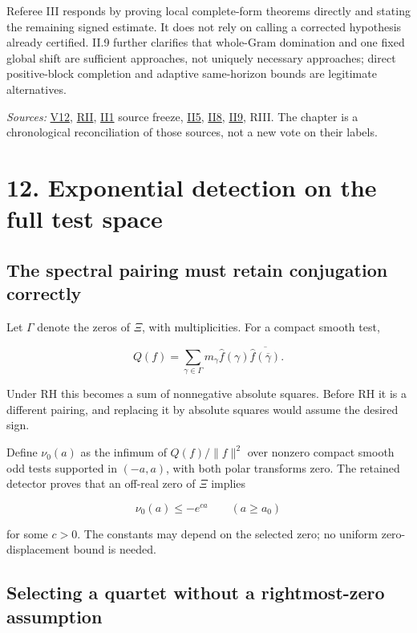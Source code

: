 \documentclass[
  10pt,
  a4paper,
  10pt,
  oneside,
  openany]{book}
\begin{document}
Referee III responds by proving local complete-form theorems directly
and stating the remaining signed estimate. It does not rely on calling a
corrected hypothesis already certified. II.9 further clarifies that
whole-Gram domination and one fixed global shift are sufficient
approaches, not uniquely necessary approaches; direct positive-block
completion and adaptive same-horizon bounds are legitimate alternatives.

\emph{Sources:} \hyperref[source-v12]{V12}, \hyperref[source-rii]{RII},
\hyperref[source-ii1]{II1} source freeze, \hyperref[source-ii5]{II5},
\hyperref[source-ii8]{II8}, \hyperref[source-ii9]{II9}, RIII. The
chapter is a chronological reconciliation of those sources, not a new
vote on their labels.

\section{12. Exponential detection on the full test
space}\label{ch-detector}

\subsection{The spectral pairing must retain conjugation
correctly}\label{the-spectral-pairing-must-retain-conjugation-correctly}

Let \(\Gamma\) denote the zeros of \(\Xi\), with multiplicities. For a
compact smooth test,

\[
Q(f)=\sum_{\gamma\in\Gamma}m_\gamma
\widehat f(\gamma)\overline{\widehat f(\overline\gamma)}.
\tag{12.1}\label{eq:12.1}
\]

Under RH this becomes a sum of nonnegative absolute squares. Before RH
it is a different pairing, and replacing it by absolute squares would
assume the desired sign.

Define \(\nu_0(a)\) as the infimum of \(Q(f)/\|f\|^2\) over nonzero
compact smooth odd tests supported in \((-a,a)\), with both polar
transforms zero. The retained detector proves that an off-real zero of
\(\Xi\) implies

\[
\nu_0(a)\le-e^{ca}\qquad(a\ge a_0)
\tag{12.2}\label{eq:12.2}
\]

for some \(c>0\). The constants may depend on the selected zero; no
uniform zero-displacement bound is needed.

\subsection{Selecting a quartet without a rightmost-zero
assumption}\label{selecting-a-quartet-without-a-rightmost-zero-assumption}
\end{document}

